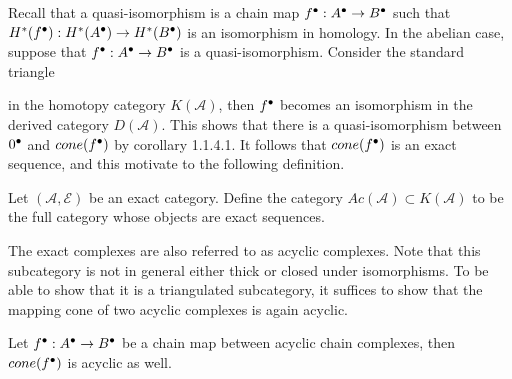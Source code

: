     Recall that a quasi-isomorphism is a chain map $f^{\bullet}:A^{\bullet}\rightarrow B^{\bullet}$ such that $H^*(f^{\bullet}):H^*(A^{\bullet})\rightarrow H^*(B^{\bullet})$ is an isomorphism in homology. In the abelian case, suppose that $f^{\bullet}:A^{\bullet}\rightarrow B^{\bullet}$ is a quasi-isomorphism. Consider the standard triangle \\  in the homotopy category $K(\mathcal{A})$, then $f^{\bullet}$ becomes an isomorphism in the derived category $D(\mathcal{A})$. This shows that there is a quasi-isomorphism between $0^{\bullet}$ and $cone(f^{\bullet})$ by corollary 1.1.4.1. It follows that $cone(f^{\bullet})$ is an exact sequence, and this motivate to the following definition.

    \begin{definition}
        Let $(\mathcal{A},\mathcal{E})$ be an exact category. Define the category $Ac(\mathcal{A})\subset K(\mathcal{A})$ to be the full category whose objects are exact sequences.
    \end{definition}

    The exact complexes are also referred to as acyclic complexes. Note that this subcategory is not in general either thick or closed under isomorphisms. To be able to show that it is a triangulated subcategory, it suffices to show that the mapping cone of two acyclic complexes is again acyclic.

    \begin{lemma}
        Let $f^{\bullet}:A^{\bullet}\rightarrow B^{\bullet}$ be a chain map between acyclic chain complexes, then $cone(f^{\bullet})$ is acyclic as well.
    \end{lemma}

